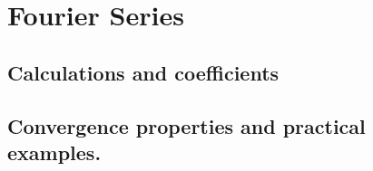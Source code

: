 \chapter{Fourier Series}\label{fourier}
\section{Calculations and coefficients}\label{fourier:calc}
\section{Convergence properties and practical examples.}\label{fourier:conv}